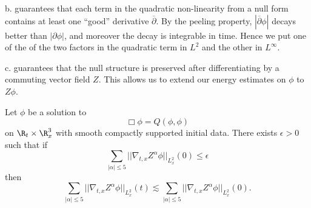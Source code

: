 \begin{remark}
	b. guarantees that each term in the quadratic non-linearity from a null form contains at least one ``good'' derivative $\overline \partial$. By the peeling property, $|\overline \partial \phi|$ decays better than $|\partial \phi|$, and moreover the decay is integrable in time. Hence we put one of the of the two factors in the quadratic term in $L^2$ and the other in $L^\infty$. 
	
	c. guarantees that the null structure is preserved after differentiating by a commuting vector field $Z$. This allows us to extend our energy estimates on $\phi$ to $Z \phi$. 
\end{remark}

\begin{theorem}
	Let $\phi$ be a solution to 
		\begin{equation}
			\Box \phi = Q(\phi, \phi) \label{eq:nullwave}
		\end{equation}
	on $\R_t \times \R^3_x$ with smooth compactly supported initial data. There exists $\epsilon > 0$ such that if
		\[ \sum_{|\alpha| \leq 5} ||\nabla_{t, x} Z^\alpha \phi||_{L^2_x} (0) \leq \epsilon \]
	then 		
		\[   \sum_{|\alpha| \leq 5} ||\nabla_{t, x} Z^\alpha \phi||_{L^2_x} (t) \lesssim   \sum_{|\alpha| \leq 5} ||\nabla_{t, x} Z^\alpha \phi||_{L^2_x} (0). \]
\end{theorem}

